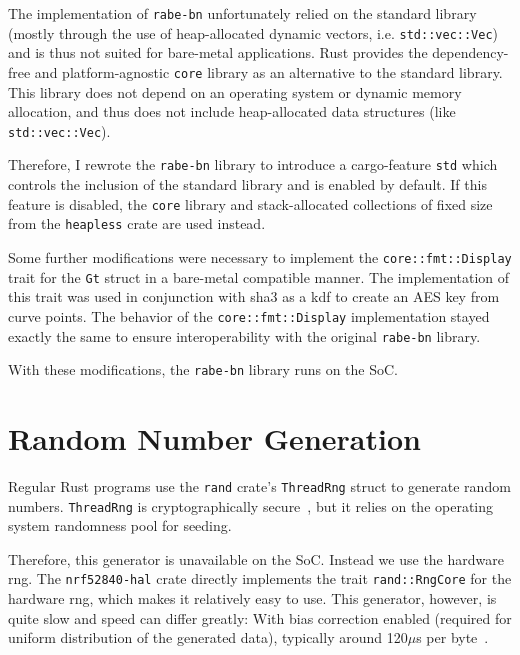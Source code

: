 The implementation of \texttt{rabe-bn} unfortunately relied on the standard library (mostly through the use of heap-allocated dynamic vectors, i.e. \texttt{std::vec::Vec}) and is thus not suited for bare-metal applications.
Rust provides the dependency-free and platform-agnostic \texttt{core} library as an alternative to the standard library.
This library does not depend on an operating system or dynamic memory allocation, and thus does not include heap-allocated data structures (like \texttt{std::vec::Vec}).

Therefore, I rewrote the \texttt{rabe-bn} library to introduce a cargo-feature \texttt{std} which controls the inclusion of the standard library and is enabled by default.
If this feature is disabled, the \texttt{core} library and stack-allocated collections of fixed size from the \texttt{heapless} crate are used instead.

Some further modifications were necessary to implement the \texttt{core::fmt::Display} trait for the \texttt{Gt} struct in a bare-metal compatible manner.
The implementation of this trait was used in conjunction with \acrshort{sha3} as a \gls{kdf} to create an AES key from curve points.
The behavior of the \texttt{core::fmt::Display} implementation stayed exactly the same to ensure interoperability with the original \texttt{rabe-bn} library.

With these modifications, the \texttt{rabe-bn} library runs on the SoC.

\section{Random Number Generation}
Regular Rust programs use the \texttt{rand} \gls{crate}'s \verb+ThreadRng+ struct to generate random numbers.
\texttt{ThreadRng} is cryptographically secure~\cite{noauthor_rust_nodate}, but it relies on the operating system randomness pool for seeding.

Therefore, this generator is unavailable on the SoC.
Instead we use the hardware \acrshort{rng}.
The \texttt{nrf52840-hal} crate directly implements the trait \texttt{rand::RngCore} for the hardware \acrshort{rng}, which makes it relatively easy to use.
This generator, however, is quite slow and speed can differ greatly: With bias correction enabled (required for uniform distribution of the generated data), typically around 120$\mu$s per byte~\cite{noauthor_nrf52840_nodate}.

